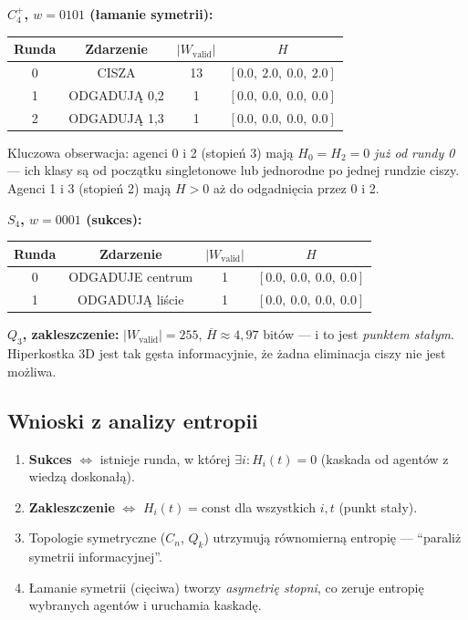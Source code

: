 \documentclass[12pt,a4paper]{article}
\theoremstyle{plain}
\theoremstyle{definition}
\theoremstyle{remark}
\newcommand{\Wval}{W_{\mathrm{valid}}}
\begin{document}
\textbf{$C_4^+$, $w = 0101$ (łamanie symetrii):}
\begin{center}
\begin{tabular}{cccc}
\toprule
Runda & Zdarzenie & $|\Wval|$ & $H$ \\
\midrule
0 & CISZA & 13 & $[0.0,\ 2.0,\ 0.0,\ 2.0]$ \\
1 & ODGADUJĄ 0,2 & 1 & $[0.0,\ 0.0,\ 0.0,\ 0.0]$ \\
2 & ODGADUJĄ 1,3 & 1 & $[0.0,\ 0.0,\ 0.0,\ 0.0]$ \\
\bottomrule
\end{tabular}
\end{center}
Kluczowa obserwacja: agenci 0 i 2 (stopień 3) mają $H_0 = H_2 = 0$ \emph{już od rundy 0} — ich klasy są od początku singletonowe lub jednorodne po jednej rundzie ciszy. Agenci 1 i 3 (stopień 2) mają $H > 0$ aż do odgadnięcia przez 0 i 2.

\textbf{$S_4$, $w = 0001$ (sukces):}
\begin{center}
\begin{tabular}{cccc}
\toprule
Runda & Zdarzenie & $|\Wval|$ & $H$ \\
\midrule
0 & ODGADUJE centrum & 1 & $[0.0,\ 0.0,\ 0.0,\ 0.0]$ \\
1 & ODGADUJĄ liście & 1 & $[0.0,\ 0.0,\ 0.0,\ 0.0]$ \\
\bottomrule
\end{tabular}
\end{center}

\textbf{$Q_3$, zakleszczenie:} $|\Wval| = 255$, $\overline{H} \approx 4{,}97$ bitów — i to jest \emph{punktem stałym}. Hiperkostka 3D jest tak gęsta informacyjnie, że żadna eliminacja ciszy nie jest możliwa.

\subsection{Wnioski z analizy entropii}

\begin{enumerate}
  \item \textbf{Sukces} $\iff$ istnieje runda, w której $\exists i : H_i(t) = 0$ (kaskada od agentów z wiedzą doskonałą).
  \item \textbf{Zakleszczenie} $\iff$ $H_i(t) = \mathrm{const}$ dla wszystkich $i, t$ (punkt stały).
  \item Topologie symetryczne ($C_n$, $Q_k$) utrzymują równomierną entropię — ``paraliż symetrii informacyjnej''.
  \item Łamanie symetrii (cięciwa) tworzy \emph{asymetrię stopni}, co zeruje entropię wybranych agentów i uruchamia kaskadę.
\end{enumerate}
\end{document}
